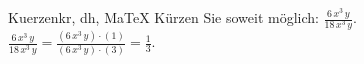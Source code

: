 \begin{MAufgabe}{Kuerzen}{kr, dh, MaTeX}
K\"urzen Sie soweit m\"oglich: $\frac{6\, x^3\, y}{18\, x^3\, y}$.\\ 
\ifLsg\MLoesung
\quad $\frac{6\, x^3\, y}{18\, x^3\, y}=\frac{(6\, x^3\, y)\cdot(1)}{(6\, x^3\, y)\cdot(3)}=\frac{1}{3}$.\else\relax\fi
 \end{MAufgabe}